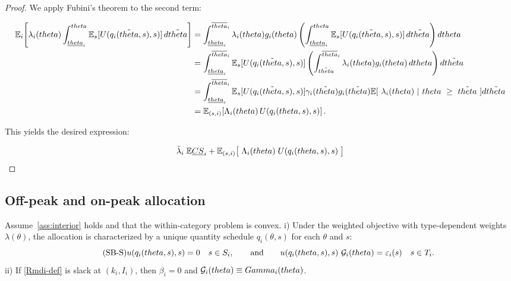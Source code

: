 \documentclass[master.tex]{subfiles}
\begin{document}
\begin{proof}
We apply Fubini's theorem to the second term:

\begin{align*}
\mathbb{E}_i\!\left[\lambda_i(theta)\int_{\underline{theta}_i}^{theta}
\mathbb{E}_s[U(q_i(\tilde{theta},s),s)]\,d\tilde{theta}\right]
&= \int_{\underline{theta}_i}^{\overline{theta}_i} \lambda_i(theta) g_i(theta) 
   \left(\int_{\underline{theta}_i}^{theta} \mathbb{E}_s[U(q_i(\tilde{theta},s),s)]\,d\tilde{theta}\right) dtheta \\
&= \int_{\underline{theta}_i}^{\overline{theta}_i} \mathbb{E}_s[U(q_i(\tilde{theta},s),s)] 
   \left(\int_{\tilde{theta}}^{\overline{theta}_i} \lambda_i(theta) g_i(theta)\,dtheta\right) d\tilde{theta} \\
&= \int_{\underline{theta}_i}^{\overline{theta}_i} \mathbb{E}_s[U(q_i(\tilde{theta},s),s)] 
    \gamma_i(\tilde {theta}) g_i(\tilde {theta}) \mathbb{E}[ \ \lambda_i( theta) \ | \ theta \ \ge \ \tilde {theta} \ ] d\tilde{theta} \\
&= \mathbb{E}_{(s,i)}\!\left[\Lambda_i(theta)\, U(q_i(theta,s),s)\right].
\end{align*}

This yields the desired expression:

\[ \tilde{\lambda}_i \;\mathbb{E}\underline{CS}_i 
      + \mathbb{E}_{(s,i)} \big[\; \Lambda_i(theta)\;  U(q_i(theta,s),s)\; \big] \]

\end{proof}

\subsection{Off-peak and on-peak allocation}

\begin{lemma}\label{lem:FOC}
Assume~\ref{ass:interior} holds and that the within-category problem is convex. i) Under the weighted objective with type-dependent weights $\lambda(\theta)$, the allocation is characterized by a unique quantity schedule $q_i(\theta,s)$ for each $\theta$ and $s$:
\[
\label{eq:SB-Smd1}\tag{SB-S}
u\!\left(q_i(theta,s),s\right)=0
\quad s\in S_i,
\qquad \text{and} \qquad
u\!\left(q_i(theta,s),s\right)\,\mathcal{G}_i(theta)=\varepsilon_i(s)
\quad s\in T_i.
\]
ii) If \eqref{Rmdi-def} is slack at $(k_i,I_i)$, then $\beta_i=0$ and $\mathcal{G}_i(theta)\equiv Gamma_i(theta)$.
\end{lemma}
\end{document}
